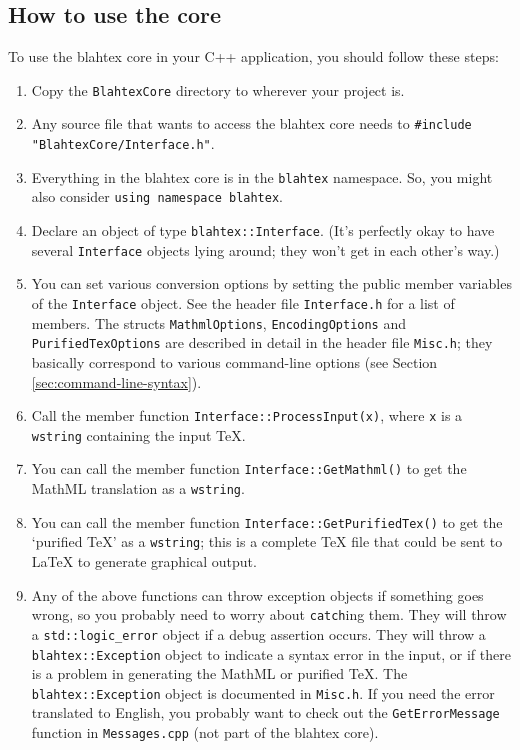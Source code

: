 \documentclass{article}
\begin{document}
\subsection{How to use the core}

To use the blahtex core in your C++ application, you should follow these steps:

\begin{enumerate}
\item Copy the \texttt{BlahtexCore} directory to wherever your project is.
\item Any source file that wants to access the blahtex core needs to \texttt{\#include "BlahtexCore/Interface.h"}.
\item Everything in the blahtex core is in the \texttt{blahtex} namespace. So, you might also consider \texttt{using namespace blahtex}.
\item Declare an object of type \texttt{blahtex::Interface}. (It's perfectly okay to have several \texttt{Interface} objects lying around; they won't get in each other's way.)
\item You can set various conversion options by setting the public member variables of the \texttt{Interface} object. See the header file \texttt{Interface.h} for a list of members. The structs \texttt{MathmlOptions}, \texttt{EncodingOptions} and \texttt{PurifiedTexOptions} are described in detail in the header file \texttt{Misc.h}; they basically correspond to various command-line options (see Section \ref{sec:command-line-syntax}).
\item Call the member function \texttt{Interface::ProcessInput(x)}, where \texttt{x} is a \texttt{wstring} containing the input \TeX{}.
\item You can call the member function \texttt{Interface::GetMathml()} to get the MathML translation as a \texttt{wstring}.
\item You can call the member function \texttt{Interface::GetPurifiedTex()} to get the `purified \TeX{}' as a \texttt{wstring}; this is a complete \TeX{} file that could be sent to \LaTeX{} to generate graphical output.
\item Any of the above functions can throw exception objects if something goes wrong, so you probably need to worry about \texttt{catch}ing them. They will throw a \texttt{std::logic\_error} object if a debug assertion occurs. They will throw a \texttt{blahtex::Exception} object to indicate a syntax error in the input, or if there is a problem in generating the MathML or purified \TeX{}. The \texttt{blahtex::Exception} object is documented in \texttt{Misc.h}. If you need the error translated to English, you probably want to check out the \texttt{GetErrorMessage} function in \texttt{Messages.cpp} (not part of the blahtex core).
\end{enumerate}
\end{document}
